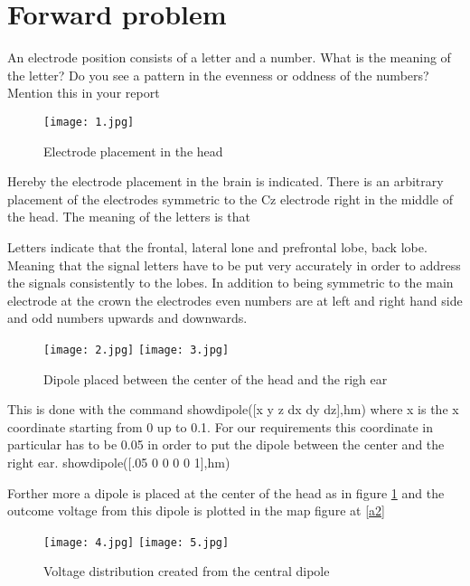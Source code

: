 \section{Forward problem}


 An electrode position
consists of a letter and a number. What is the meaning of the letter? Do you see a
pattern in the evenness or oddness of the numbers? Mention this in your report

\begin{figure}[!htbp]
\centering
\texttt{[image: 1.jpg]}
\caption{Electrode placement in the head}
\end{figure}

Hereby the electrode placement in the brain is indicated. There is an arbitrary placement of the electrodes symmetric to the Cz electrode right in the middle of the head. The meaning of the letters is that 

Letters indicate that the frontal, lateral lone and prefrontal lobe, back lobe. Meaning that the signal letters have to be put very accurately in order to address the signals consistently to the lobes. In addition to being symmetric to the main electrode at the crown the electrodes even numbers are at left and right hand side and odd numbers upwards and downwards.

\begin{figure}[!htbp]
%
\centering
\texttt{[image: 2.jpg]}
\subcaption{}
\endminipage\hfill
{}%
\centering
\texttt{[image: 3.jpg]}
\subcaption{}
\endminipage\hfill
\caption{Dipole placed between the center of the head and the righ ear}
\end{figure}
This is done with the command showdipole([x y z dx dy dz],hm) where x is the x coordinate starting from 0 up to 0.1.
For our requirements this coordinate in particular has to be 0.05 in order to put the dipole between the center and the right ear.
showdipole([.05 0 0 0 0 1],hm)

Forther more a dipole is placed at the center of the head as in figure \ref{a1} and the outcome voltage from this dipole is plotted in the map figure at \ref{a2}

\begin{figure}[!htbp]
%
\centering
\texttt{[image: 4.jpg]}
\label{a2}
\endminipage\hfill
{}%
\centering
\texttt{[image: 5.jpg]}
\label{a1}
\endminipage\hfill
\caption{Voltage distribution created from the central dipole}
\end{figure}


